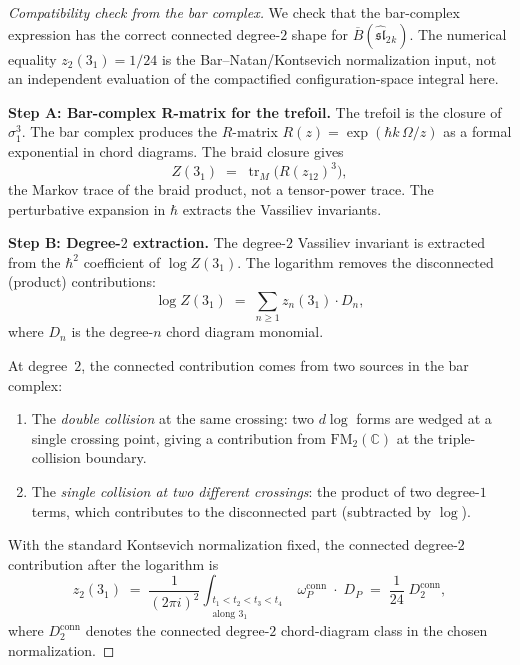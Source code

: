 \documentclass[11pt]{article}
\newcommand{\fsl}{\mathfrak{sl}}
\newcommand{\barB}{\overline{B}}
\newcommand{\C}{\mathbb{C}}
\newcommand{\FM}{\mathrm{FM}}
\begin{document}
\begin{proof}[Compatibility check from the bar complex]
We check that the bar-complex expression has the correct connected
degree-$2$ shape for $\barB(\widehat{\fsl}_2{}_k)$.  The numerical
equality $z_2(3_1)=1/24$ is the Bar--Natan/Kontsevich normalization
input, not an independent evaluation of the compactified
configuration-space integral here.

\medskip
\noindent\textbf{Step A: Bar-complex R-matrix for the trefoil.}
The trefoil is the closure of $\sigma_1^3$.  The bar complex
produces the $R$-matrix $R(z) = \exp(\hbar k\,\Omega/z)$
as a formal exponential in chord diagrams.  The braid closure
gives
\[
  Z(3_1)
  \;=\;
  \operatorname{tr}_{M}\bigl(R(z_{12})^3\bigr),
\]
the Markov trace of the braid product, not a tensor-power trace.
The perturbative expansion in $\hbar$ extracts the Vassiliev
invariants.

\medskip
\noindent\textbf{Step B: Degree-$2$ extraction.}
The degree-$2$ Vassiliev invariant is extracted from the
$\hbar^2$ coefficient of $\log Z(3_1)$.  The logarithm
removes the disconnected (product) contributions:
\[
  \log Z(3_1)
  \;=\;
  \sum_{n \ge 1} z_n(3_1) \cdot D_n,
\]
where $D_n$ is the degree-$n$ chord diagram monomial.

At degree~$2$, the connected contribution comes from two
sources in the bar complex:
\begin{enumerate}
\item The \emph{double collision} at the same crossing: two
  $d\log$ forms are wedged at a single crossing point, giving a
  contribution from $\FM_2(\C)$ at the triple-collision boundary.

\item The \emph{single collision at two different crossings}: the
  product of two degree-$1$ terms, which contributes to the
  disconnected part (subtracted by $\log$).
\end{enumerate}

With the standard Kontsevich normalization fixed, the connected
degree-$2$ contribution after the logarithm is
\begin{equation}\label{eq:connected-2}
  z_2(3_1)
  \;=\;
  \frac{1}{(2\pi i)^2}
  \int_{\substack{t_1 < t_2 < t_3 < t_4 \\
  \text{along } 3_1}}
  \omega_{P}^{\mathrm{conn}}\;\cdot\; D_P
  \;=\;
  \frac{1}{24}\;D_2^{\mathrm{conn}},
\end{equation}
where $D_2^{\mathrm{conn}}$ denotes the connected degree-$2$
chord-diagram class in the chosen normalization.


\end{proof}
\end{document}
